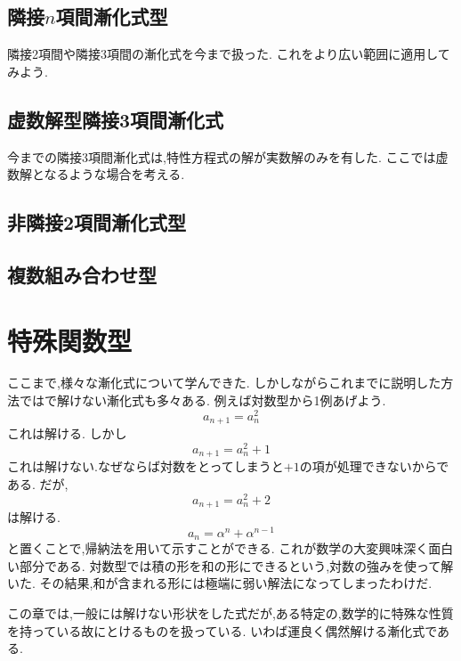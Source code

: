 \documentclass[dvipdfmx,a4paper,11pt,fleqn,openany]{jsbook}
\begin{document}
  \subsection{隣接$n$項間漸化式型}
    隣接2項間や隣接3項間の漸化式を今まで扱った.
    これをより広い範囲に適用してみよう.
 
  \subsection{虚数解型隣接3項間漸化式}
    今までの隣接3項間漸化式は,特性方程式の解が実数解のみを有した.
    ここでは虚数解となるような場合を考える.
  \subsection{非隣接2項間漸化式型}
  \subsection{複数組み合わせ型}
\section{特殊関数型}
  ここまで,様々な漸化式について学んできた.
  しかしながらこれまでに説明した方法ではで解けない漸化式も多々ある.
  例えば対数型から1例あげよう.
  \[
    a_{n+1}=a_n^2
  \]
  これは解ける.
  しかし
  \[
    a_{n+1}=a_n^2+1
  \]
  これは解けない.なぜならば対数をとってしまうと$+1$の項が処理できないからである.
  だが,
  \[
    a_{n+1}=a_n^2+2
  \]
  は解ける.
  \[
    a_n=\alpha^{n}+\alpha^{n-1}
  \]
  と置くことで,帰納法を用いて示すことができる.
  これが数学の大変興味深く面白い部分である.
  対数型では積の形を和の形にできるという,対数の強みを使って解いた.
  その結果,和が含まれる形には極端に弱い解法になってしまったわけだ.

  この章では,一般には解けない形状をした式だが,ある特定の,数学的に特殊な性質を持っている故にとけるものを扱っている.
  いわば運良く偶然解ける漸化式である.
\end{document}
